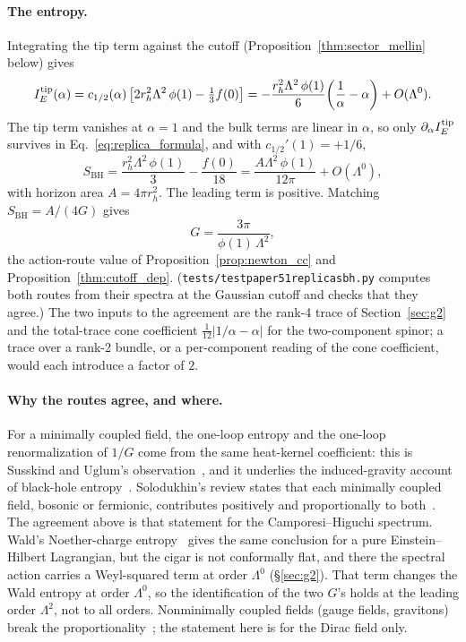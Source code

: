 \documentclass[11pt,a4paper]{article}
\theoremstyle{plain}
\theoremstyle{definition}
\newcommand{\BH}{\mathrm{BH}}
\renewcommand{\_}{\textunderscore\allowbreak}
\begin{document}
\paragraph{The entropy.} Integrating the tip term against the cutoff
(Proposition~\ref{thm:sector_mellin} below) gives
\begin{equation}
  I_E^{\rm tip}(\alpha)
    = c_{1/2}(\alpha)\left[2 r_h^2 \Lambda^2\,\phi(1) - \tfrac13 f(0)\right]
    = -\frac{r_h^2 \Lambda^2\,\phi(1)}{6}\!\left(\frac{1}{\alpha} - \alpha\right)
      + O(\Lambda^0).
\end{equation}
The tip term vanishes at $\alpha = 1$ and the bulk terms are linear in
$\alpha$, so only $\partial_\alpha I_E^{\rm tip}$ survives in
Eq.~\eqref{eq:replica_formula}, and with $c_{1/2}'(1) = +1/6$,
\begin{equation}
  S_{\BH} = \frac{r_h^2 \Lambda^2\,\phi(1)}{3} - \frac{f(0)}{18}
          = \frac{A \Lambda^2\,\phi(1)}{12 \pi} + O(\Lambda^0),
  \label{eq:S_BH}
\end{equation}
with horizon area $A = 4 \pi r_h^2$. The leading term is positive. Matching
$S_{\BH} = A/(4G)$ gives
\begin{equation}
  G = \frac{3 \pi}{\phi(1)\,\Lambda^2},
\end{equation}
the action-route value of Proposition~\ref{prop:newton_cc} and
Proposition~\ref{thm:cutoff_dep}. (\texttt{tests/test\_paper51\_replica\_sbh.py}
computes both routes from their spectra at the Gaussian cutoff and checks
that they agree.) The two inputs to the agreement are the rank-4 trace of
Section~\ref{sec:g2} and the total-trace cone coefficient
$\tfrac{1}{12}|1/\alpha - \alpha|$ for the two-component spinor; a trace
over a rank-2 bundle, or a per-component reading of the cone coefficient,
would each introduce a factor of $2$.

\paragraph{Why the routes agree, and where.} For a minimally coupled field,
the one-loop entropy and the one-loop renormalization of $1/G$ come from
the same heat-kernel coefficient: this is Susskind and Uglum's
observation~\cite{susskind_uglum1994}, and it underlies the induced-gravity
account of black-hole entropy~\cite{frolov_fursaev1997}. Solodukhin's review
states that each minimally coupled field, bosonic or fermionic, contributes
positively and proportionally to both~\cite{solodukhin2011_review}. The
agreement above is that statement for the Camporesi--Higuchi spectrum. Wald's
Noether-charge entropy~\cite{wald1993} gives the same conclusion for a pure
Einstein--Hilbert Lagrangian, but the cigar is not conformally flat, and
there the spectral action carries a Weyl-squared term at order $\Lambda^0$
(\S\ref{sec:g2}). That term changes the Wald entropy at order $\Lambda^0$,
so the identification of the two $G$'s holds at the leading order
$\Lambda^2$, not to all orders. Nonminimally coupled fields (gauge fields,
gravitons) break the proportionality~\cite{kabat1995,
solodukhin2011_review}; the statement here is for the Dirac field only.
\end{document}

